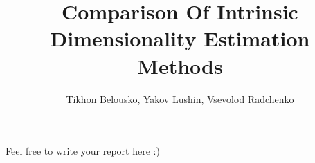 \documentclass[14pt, a4paper]{article}
\begin{document}
\title{Comparison Of Intrinsic Dimensionality Estimation Methods}
\author{Tikhon Belousko, Yakov Lushin, Vsevolod Radchenko}
\maketitle


Feel free to write your report here :)
\end{document}
